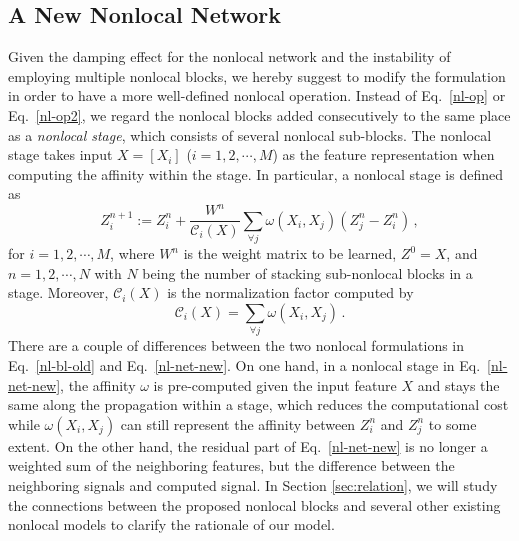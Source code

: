 \documentclass{article}
\begin{document}
\subsection{A New Nonlocal Network}
Given the damping effect for the nonlocal network and the instability of employing multiple nonlocal blocks, we hereby suggest to modify the formulation in order to have a more well-defined nonlocal operation. Instead of Eq.~\eqref{nl-op} or Eq.~\eqref{nl-op2}, we regard the nonlocal blocks added consecutively to the same place as a \textit{nonlocal stage}, which consists of several nonlocal sub-blocks. The nonlocal stage takes input $X=[X_i]$ ($i=1,2,\cdots,M$) as the feature representation when computing the affinity within the stage. In particular, a nonlocal stage is defined as
\begin{equation}\label{nl-net-new}
Z^{n+1}_i := Z^n_i + \frac{W^n}{\mathcal{C}_i(X)}\sum_{\forall j} \omega(X_i,X_j)(Z^n_j-Z^n_i)\,,
\end{equation}
for $i=1,2,\cdots,M$, where $W^n$ is the weight matrix to be learned, $Z^0=X$, and $n=1,2,\cdots,N$ with $N$ being the number of stacking sub-nonlocal blocks in a stage. Moreover, $\mathcal{C}_i(X)$ is the normalization factor computed by
\begin{equation}
\mathcal{C}_i(X)=\sum_{\forall j} \omega(X_i,X_j)\,.
\end{equation}
There are a couple of differences between the two nonlocal formulations
in Eq.~\eqref{nl-bl-old} and Eq.~\eqref{nl-net-new}. On one hand, in a nonlocal stage in Eq.~\eqref{nl-net-new}, the affinity $\omega$ is pre-computed given the input feature $X$ and stays the same along the propagation within a stage, which reduces the computational cost while $\omega(X_i,X_j)$ can still represent the affinity between $Z^n_i$ and $Z^n_j$ to some extent. On the other hand, the residual part of  Eq.~\eqref{nl-net-new} is no longer a weighted sum of the neighboring features, but the difference between the neighboring signals and computed signal. In Section \ref{sec:relation}, we will study the connections between the proposed nonlocal blocks and several other existing nonlocal models to clarify the rationale of our model.

\end{document}
